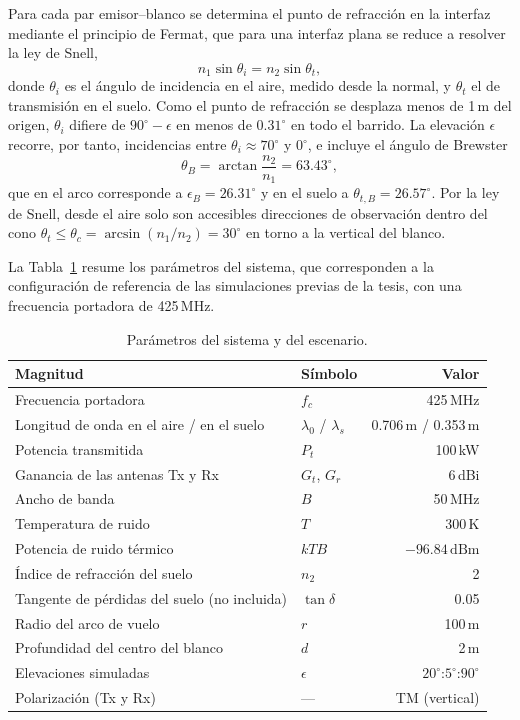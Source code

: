 \documentclass[11pt,a4paper]{report}
\newcommand{\dBm}{\,\mathrm{dBm}}
\begin{document}
Para cada par emisor--blanco se determina el punto de refracción en la
interfaz mediante el principio de Fermat, que para una interfaz plana se
reduce a resolver la ley de Snell,
\begin{equation}
  n_1\sin\theta_i = n_2\sin\theta_t ,
\end{equation}
donde $\theta_i$ es el ángulo de incidencia en el aire, medido desde la
normal, y $\theta_t$ el de transmisión en el suelo. Como el punto de
refracción se desplaza menos de 1\,m del origen, $\theta_i$ difiere de
$90^\circ-\epsilon$ en menos de $0.31^\circ$ en todo el barrido. La
elevación $\epsilon$ recorre, por tanto, incidencias entre
$\theta_i\approx 70^\circ$ y $0^\circ$, e incluye el ángulo de Brewster
\begin{equation}
  \theta_B = \arctan\frac{n_2}{n_1} = 63.43^\circ ,
\end{equation}
que en el arco corresponde a $\epsilon_B = 26.31^\circ$ y en el suelo a
$\theta_{t,B}=26.57^\circ$. Por la ley de Snell, desde el aire solo son
accesibles direcciones de observación dentro del cono
$\theta_t\le\theta_c=\arcsin(n_1/n_2)=30^\circ$ en torno a la vertical del
blanco.

La Tabla~\ref{tab:parametros} resume los parámetros del sistema, que
corresponden a la configuración de referencia de las simulaciones previas de
la tesis, con una frecuencia portadora de 425\,MHz.

\begin{table}[H]
\centering
\caption{Parámetros del sistema y del escenario.}
\label{tab:parametros}
\begin{tabular}{@{}llr@{}}
\toprule
\textbf{Magnitud} & \textbf{Símbolo} & \textbf{Valor} \\
\midrule
Frecuencia portadora & $f_c$ & 425\,MHz \\
Longitud de onda en el aire / en el suelo & $\lambda_0$ / $\lambda_s$ & 0.706\,m / 0.353\,m \\
Potencia transmitida & $P_t$ & 100\,kW \\
Ganancia de las antenas Tx y Rx & $G_t$, $G_r$ & 6\,dBi \\
Ancho de banda & $B$ & 50\,MHz \\
Temperatura de ruido & $T$ & 300\,K \\
Potencia de ruido térmico & $kTB$ & $-96.84\dBm$ \\
Índice de refracción del suelo & $n_2$ & 2 \\
Tangente de pérdidas del suelo (no incluida) & $\tan\delta$ & 0.05 \\
Radio del arco de vuelo & $r$ & 100\,m \\
Profundidad del centro del blanco & $d$ & 2\,m \\
Elevaciones simuladas & $\epsilon$ & $20^\circ$:$5^\circ$:$90^\circ$ \\
Polarización (Tx y Rx) & --- & TM (vertical) \\
\bottomrule
\end{tabular}
\end{table}
\end{document}
